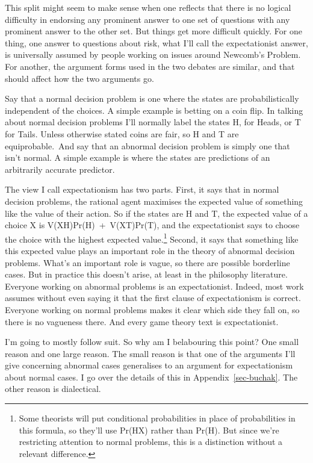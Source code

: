 \documentclass[
  12pt,
  letterpaper,
  DIV=11,
  numbers=noendperiod]{scrreprt}
\begin{document}
This split might seem to make sense when one reflects that there is no
logical difficulty in endorsing any prominent answer to one set of
questions with any prominent answer to the other set. But things get
more difficult quickly. For one thing, one answer to questions about
risk, what I'll call the expectationist answer, is universally assumed
by people working on issues around Newcomb's Problem. For another, the
argument forms used in the two debates are similar, and that should
affect how the two arguments go.~

Say that a normal decision problem is one where the states are
probabilistically independent of the choices. A simple example is
betting on a coin flip. In talking about normal decision problems I'll
normally label the states H, for Heads, or T for Tails. Unless otherwise
stated coins are fair, so H and T are equiprobable.~And say that an
abnormal decision problem is simply one that isn't normal. A simple
example is where the states are predictions of an arbitrarily accurate
predictor.

The view I call expectationism has two parts. First, it says that in
normal decision problems, the rational agent maximises the expected
value of something like the value of their action. So if the states are
H and T, the expected value of a choice X is V(XH)Pr(H)~+~V(XT)Pr(T),
and the expectationist says to choose the choice with the highest
expected value.\footnote{Some theorists will put conditional
  probabilities in place of probabilities in this formula, so they'll
  use Pr(H\textbar X) rather than Pr(H). But since we're restricting
  attention to normal problems, this is a distinction without a relevant
  difference.} Second, it says that something like this expected value
plays an important role in the theory of abnormal decision problems.
What's an important role is vague, so there are possible borderline
cases. But in practice this doesn't arise, at least in the philosophy
literature. Everyone working on abnormal problems is an expectationist.
Indeed, most work assumes without even saying it that the first clause
of expectationism is correct. Everyone working on normal problems makes
it clear which side they fall on, so there is no vagueness there. And
every game theory text is expectationist.~

I'm going to mostly follow suit. So why am I belabouring this point? One
small reason and one large reason. The small reason is that one of the
arguments I'll give concerning abnormal cases generalises to an argument
for expectationism about normal cases. I go over the details of this in
Appendix~\ref{sec-buchak}. The other reason is dialectical.
\end{document}
